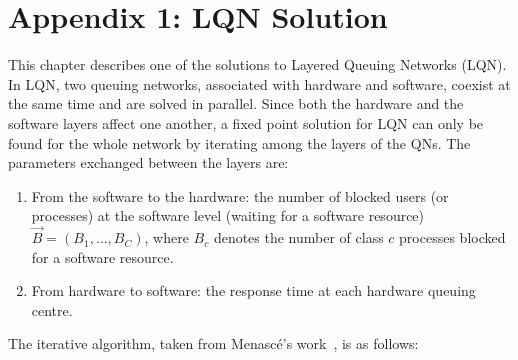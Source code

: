 

 \chapter{Appendix 1: LQN Solution} 
 \label{ch:appendix1} 
This chapter describes one of the solutions to Layered Queuing Networks (LQN). 
In LQN, two queuing networks, associated with hardware and software, coexist at the same time and are solved in parallel. 
 Since both the hardware and the software layers affect one another, a fixed point solution for LQN can only be found for the whole network \cite{petriu_approximate_1991} by iterating among the layers of the QNs. The parameters exchanged between the layers are:  
 \begin{enumerate} 
 \item From the software to the hardware: the number of blocked users (or processes) at the software level (waiting for a software resource) $\vec{B}=(B_1, \ldots , B_C)$, 
 where $B_c$  denotes the number of class $c$ processes blocked for a software resource. 
 \item From hardware to software: the response time at each hardware queuing centre. 
 \end{enumerate}
 The iterative algorithm, taken from Menasc{\'e}'s work~\cite{menasce2004performance,menasce2002simple}, is as follows: 

